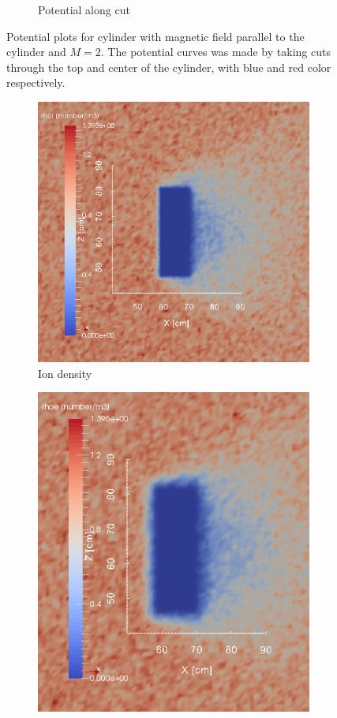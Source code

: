 \documentclass[twoside]{article}
\begin{document}
\begin{figure}[H]
\begin{subfigure}{.5\textwidth}
  \caption{Potential along cut}
  \label{fig:sub52}
\end{subfigure}
\caption{Potential plots for cylinder with magnetic field parallel to the cylinder and $M=2$. The potential curves was made by taking cuts through the top and center of the cylinder, with blue and red color respectively.}
\label{fig:5}
\end{figure}

\begin{figure}[H]
\centering
\begin{subfigure}{.5\textwidth}
  \centering
  \includegraphics[width=\linewidth]{zoom_png/rhoi_zoom.png}
  \caption{Ion density}
  \label{fig:sub61}
\end{subfigure}%
\begin{subfigure}{.5\textwidth}
  \centering
  \includegraphics[width=0.8155\linewidth]{zoom_png/rhoe_zoom.png}

\end{subfigure}
\end{figure}
\end{document}
